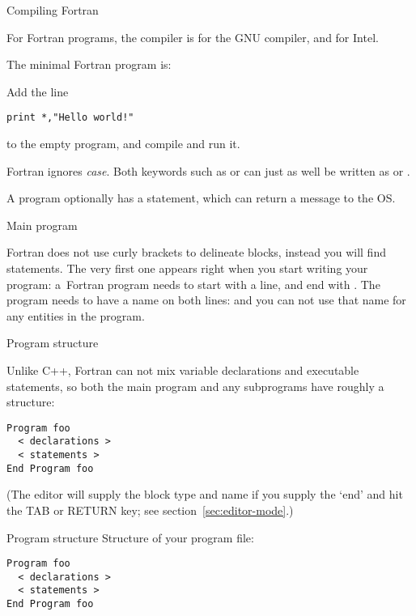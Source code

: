  {Compiling Fortran}

For Fortran programs, the compiler is  for the
GNU compiler, and  for Intel.

The minimal Fortran program is:
%

\begin{exercise}
  Add the line
\begin{lstlisting}
print *,"Hello world!"
\end{lstlisting}
to the empty program, and compile and run it.
\end{exercise}

Fortran ignores \emph{case}.
Both keywords such as  or  can just as well be written as
 or .

A program optionally has a  statement, which can
return a message to the \ac{OS}.
%

 {Main program}

Fortran does not use curly brackets to delineate blocks, instead you
will find  statements. The very first one appears
right when you start writing your program:
a~Fortran program needs to start with a  line, and end with
. The program needs to have a name on both lines:
%
%
and you can not use that name for any entities in the program.

 {Program structure}

Unlike C++, Fortran can not mix variable declarations and executable
statements, so both the main program and any subprograms have roughly
a
structure:
\begin{lstlisting}
Program foo
  < declarations >
  < statements >
End Program foo
\end{lstlisting}
(The  editor will supply the block type and name if
you supply the `end' and hit the TAB or RETURN key; see
section~\ref{sec:editor-mode}.)

\begin{slide}{Program structure}
  \label{sl:programf}
Structure of your program file:
\begin{lstlisting}
Program foo
  < declarations >
  < statements >
End Program foo
\end{lstlisting}
\end{slide}

